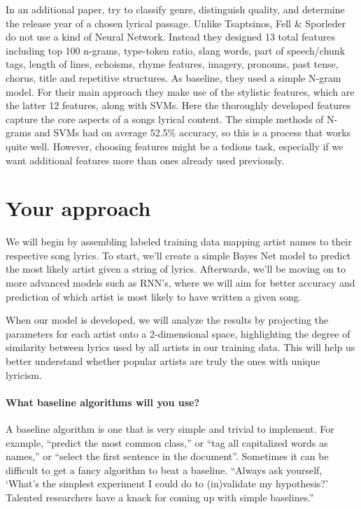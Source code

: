 \documentclass[11pt,a4paper]{article}
\begin{document}
In an additional paper,  try to classify genre, distinguish quality, and determine the release year of a chosen lyrical passage. 
Unlike Tsaptsinos, Fell \& Sporleder do not use a kind of Neural Network. 
Instead they designed 13 total features including top 100 n-grams, type-token ratio, slang words, part of speech/chunk tags, length of lines, echoisms, rhyme features, imagery, pronouns, past tense, chorus, title and repetitive structures. 
As baseline, they used a simple N-gram model. 
For their main approach they make use of the stylistic features, which are the latter 12 features, along with SVMs. 
Here the thoroughly developed features capture the core aspects of a songs lyrical content. 
The simple methods of N-grams and SVMs had on average 52.5\% accuracy, so this is a process that works quite well. 
However, choosing features might be a tedious task, especially if we want additional features more than ones already used previously. 

\section{Your approach}
We will begin by assembling labeled training data mapping artist names to their respective song lyrics. To start, we'll create a simple Bayes Net model to predict the most likely artist given a string of lyrics. Afterwards, we'll be moving on to more advanced models such as RNN's, where we will aim for better accuracy and prediction of which artist is most likely to have written a given song. 

When our model is developed, we will analyze the results by projecting the parameters for each artist onto a 2-dimensional space, highlighting the degree of similarity between lyrics used by all artists in our training data. This will help us better understand whether popular artists are truly the ones with unique lyricism.

\paragraph{What baseline algorithms will you use?}
A baseline algorithm is one that is very simple and trivial to implement. For example, “predict the most common class,” or “tag all capitalized words as names,” or “select the first sentence in the document”. Sometimes it can be difficult to get a fancy algorithm to beat a baseline. “Always ask yourself, ‘What’s the simplest experiment I could do to (in)validate my hypothesis?’ Talented researchers have a knack for coming up with simple baselines.”
\end{document}
